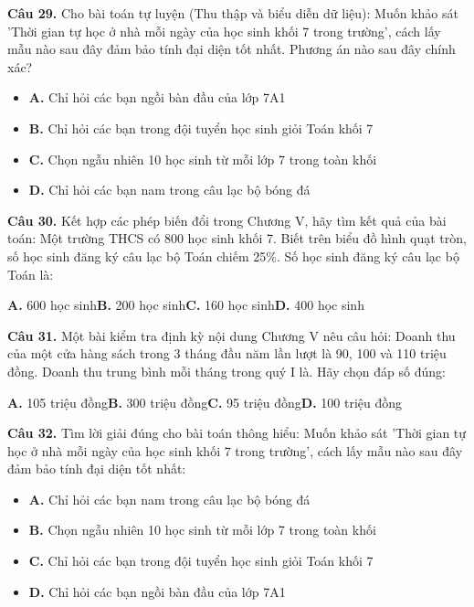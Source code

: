 \documentclass[11pt,a4paper]{article}
\begin{document}
\textbf{\color{primary} Câu 29.} Cho bài toán tự luyện (Thu thập và biểu diễn dữ liệu): Muốn khảo sát 'Thời gian tự học ở nhà mỗi ngày của học sinh khối 7 trong trường', cách lấy mẫu nào sau đây đảm bảo tính đại diện tốt nhất. Phương án nào sau đây chính xác?\par
\begin{itemize}\setlength{\itemsep}{1pt}\setlength{\parskip}{0pt}
  \item[] \textbf{A.} Chỉ hỏi các bạn ngồi bàn đầu của lớp 7A1
  \item[] \textbf{B.} Chỉ hỏi các bạn trong đội tuyển học sinh giỏi Toán khối 7
  \item[] \textbf{C.} Chọn ngẫu nhiên 10 học sinh từ mỗi lớp 7 trong toàn khối
  \item[] \textbf{D.} Chỉ hỏi các bạn nam trong câu lạc bộ bóng đá
\end{itemize}\vspace{2pt}
\textbf{\color{primary} Câu 30.} Kết hợp các phép biến đổi trong Chương V, hãy tìm kết quả của bài toán: Một trường THCS có 800 học sinh khối 7. Biết trên biểu đồ hình quạt tròn, số học sinh đăng ký câu lạc bộ Toán chiếm 25\%. Số học sinh đăng ký câu lạc bộ Toán là:\par
\hspace*{1.5em}\textbf{A.} 600 học sinh\quad\quad \textbf{B.} 200 học sinh\quad\quad \textbf{C.} 160 học sinh\quad\quad \textbf{D.} 400 học sinh\par\vspace{2pt}
\textbf{\color{primary} Câu 31.} Một bài kiểm tra định kỳ nội dung Chương V nêu câu hỏi: Doanh thu của một cửa hàng sách trong 3 tháng đầu năm lần lượt là 90, 100 và 110 triệu đồng. Doanh thu trung bình mỗi tháng trong quý I là. Hãy chọn đáp số đúng:\par
\hspace*{1.5em}\textbf{A.} 105 triệu đồng\quad\quad \textbf{B.} 300 triệu đồng\quad\quad \textbf{C.} 95 triệu đồng\quad\quad \textbf{D.} 100 triệu đồng\par\vspace{2pt}
\textbf{\color{primary} Câu 32.} Tìm lời giải đúng cho bài toán thông hiểu: Muốn khảo sát 'Thời gian tự học ở nhà mỗi ngày của học sinh khối 7 trong trường', cách lấy mẫu nào sau đây đảm bảo tính đại diện tốt nhất:\par
\begin{itemize}\setlength{\itemsep}{1pt}\setlength{\parskip}{0pt}
  \item[] \textbf{A.} Chỉ hỏi các bạn nam trong câu lạc bộ bóng đá
  \item[] \textbf{B.} Chọn ngẫu nhiên 10 học sinh từ mỗi lớp 7 trong toàn khối
  \item[] \textbf{C.} Chỉ hỏi các bạn trong đội tuyển học sinh giỏi Toán khối 7
  \item[] \textbf{D.} Chỉ hỏi các bạn ngồi bàn đầu của lớp 7A1
\end{itemize}\vspace{2pt}
\end{document}
